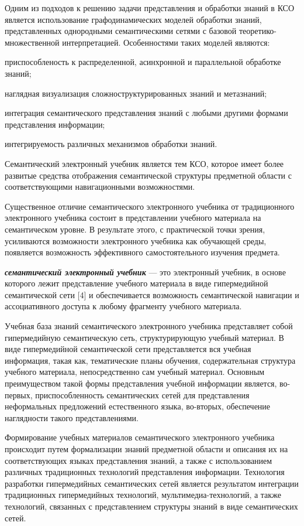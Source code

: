 Одним из подходов к решению задачи представления и обработки знаний в КСО является использование графодинамических моделей обработки знаний, представленных однородными семантическими сетями с базовой теоретико-множественной интерпретацией. Особенностями таких моделей являются:

\begin{textitemize}
	\item приспособленость к распределенной, асинхронной и параллельной обработке знаний;
	\item наглядная визуализация сложноструктурированных знаний и метазнаний;
	\item интеграция семантического представления знаний с любыми другими формами представления информации;
	\item интегрируемость различных механизмов обработки знаний.
\end{textitemize}

Семантический электронный учебник является тем КСО, которое имеет более развитые средства отображения семантической структуры предметной области с соответствующими навигационными возможностями.

Существенное отличие семантического электронного учебника от традиционного электронного учебника состоит в представлении учебного материала на семантическом уровне. В результате этого, с практической точки зрения, усиливаются возможности электронного учебника как обучающей среды, появляется возможность эффективного самостоятельного изучения предмета.

\textbf{\textit{семантический электронный учебник}} --- это электронный учебник, в основе которого лежит представление учебного материала в виде гипермедийной семантической сети [4] и обеспечивается возможность семантической навигации и ассоциативного доступа к любому фрагменту учебного материала.

Учебная база знаний семантического электронного учебника представляет собой гипермедийную семантическую сеть, структурирующую учебный материал. В виде гипермедийной семантической сети представляется вся учебная информация, такая как, тематические планы обучения, содержательная структура учебного материала, непосредственно сам учебный материал. Основным преимуществом такой формы представления учебной информации является, во-первых, приспособленность семантических сетей для представления неформальных предложений естественного языка, во-вторых, обеспечение наглядности такого представлениями.

Формирование учебных материалов семантического электронного учебника происходит путем формализации знаний предметной области и описания их на соответствующих языках представления знаний, а также с использованием различных традиционных технологий представления информации. Технология разработки гипермедийных семантических сетей является результатом интеграции традиционных гипермедийных технологий, мультимедиа-технологий, а также технологий, связанных с представлением структуры знаний в виде семантических сетей.

